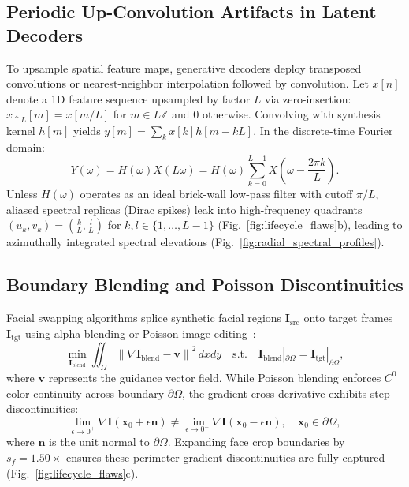 \documentclass[10pt,twocolumn,letterpaper]{article}
\newcommand{\norm}[1]{\left\lVert#1\right\rVert}
\begin{document}
\subsection{Periodic Up-Convolution Artifacts in Latent Decoders}
\label{app:periodic_artifacts}

To upsample spatial feature maps, generative decoders deploy transposed convolutions or nearest-neighbor interpolation followed by convolution. Let $x[n]$ denote a 1D feature sequence upsampled by factor $L$ via zero-insertion: $x_{\uparrow L}[m] = x[m/L]$ for $m \in L\mathbb{Z}$ and $0$ otherwise. Convolving with synthesis kernel $h[m]$ yields $y[m] = \sum_k x[k] h[m - kL]$. In the discrete-time Fourier domain:
\begin{equation}
\label{eq:transposed_conv_spectrum}
Y(\omega) = H(\omega) X(L\omega) = H(\omega) \sum_{k=0}^{L-1} X\left( \omega - \frac{2\pi k}{L} \right).
\end{equation}
Unless $H(\omega)$ operates as an ideal brick-wall low-pass filter with cutoff $\pi/L$, aliased spectral replicas (Dirac spikes) leak into high-frequency quadrants $(u_k, v_k) = (\frac{k}{L}, \frac{l}{L})$ for $k, l \in \{1, \dots, L-1\}$ (Fig.~\ref{fig:lifecycle_flaws}b), leading to azimuthally integrated spectral elevations (Fig.~\ref{fig:radial_spectral_profiles}).

\subsection{Boundary Blending and Poisson Discontinuities}
\label{app:boundary_blending}

Facial swapping algorithms splice synthetic facial regions $\mathbf{I}_{\mathrm{src}}$ onto target frames $\mathbf{I}_{\mathrm{tgt}}$ using alpha blending or Poisson image editing~\cite{perez2003poisson}:
\begin{equation}
\label{eq:poisson_editing}
\min_{\mathbf{I}_{\mathrm{blend}}} \iint_{\Omega} \norm{\nabla \mathbf{I}_{\mathrm{blend}} - \mathbf{v}}^2 \, dx dy \quad \text{s.t.} \quad \mathbf{I}_{\mathrm{blend}}|_{\partial \Omega} = \mathbf{I}_{\mathrm{tgt}}|_{\partial \Omega},
\end{equation}
where $\mathbf{v}$ represents the guidance vector field. While Poisson blending enforces $C^0$ color continuity across boundary $\partial \Omega$, the gradient cross-derivative exhibits step discontinuities:
\begin{equation}
\label{eq:boundary_discontinuity}
\lim_{\epsilon \to 0^+} \nabla \mathbf{I}(\mathbf{x}_0 + \epsilon \mathbf{n}) \ne \lim_{\epsilon \to 0^-} \nabla \mathbf{I}(\mathbf{x}_0 - \epsilon \mathbf{n}), \quad \mathbf{x}_0 \in \partial \Omega,
\end{equation}
where $\mathbf{n}$ is the unit normal to $\partial \Omega$. Expanding face crop boundaries by $s_f = 1.50\times$ ensures these perimeter gradient discontinuities are fully captured (Fig.~\ref{fig:lifecycle_flaws}c).
\end{document}
